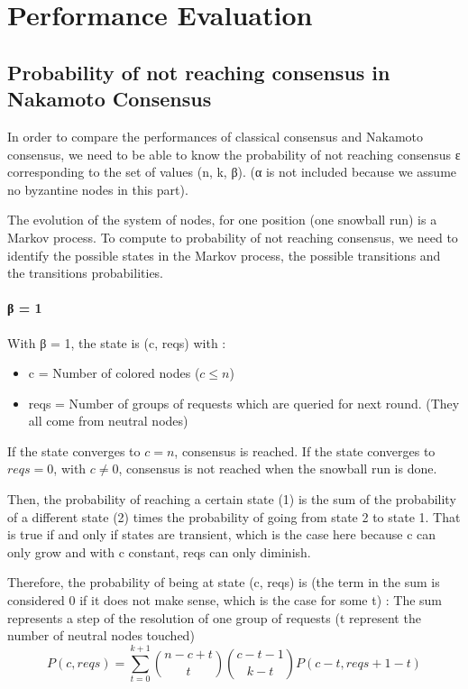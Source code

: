 \documentclass[11pt, twocolumn]{article}
\begin{document}
\section{Performance Evaluation}
\subsection{Probability of not reaching consensus in Nakamoto Consensus}

In order to compare the performances of classical consensus and Nakamoto consensus, we need to be able to know the probability of not reaching consensus ε corresponding to the set 
of values (n, k, β). (α is not included because we assume no byzantine nodes in this part).

The evolution of the system of nodes, for one position (one snowball run) is a Markov process. To compute to probability of not reaching consensus, we need to identify the possible states in the 
Markov process, the possible transitions and the transitions probabilities.

\paragraph{β = 1}
With β = 1, the state is (c, reqs) with :
\begin{itemize}
    \item c = Number of colored nodes ($c \leq n$)
    \item reqs = Number of groups of requests which are queried for next round. (They all come from neutral nodes)
\end{itemize}
If the state converges to $c = n$, consensus is reached.
If the state converges to $reqs = 0$, with $c \neq 0$, consensus is not reached when the snowball run is done.

Then, the probability of reaching a certain state (1) is the sum of the probability of a different state (2) times the probability of going from state 2 to state 1.
That is true if and only if states are transient, which is the case here because c can only grow and with c constant, reqs can only diminish.

Therefore, the probability of being at state (c, reqs) is (the term in the sum is considered 0 if it does not make sense, which is the case for some t) :
The sum represents a step of the resolution of one group of requests (t represent the number of neutral nodes touched)
\begin{equation*}
    P(c, reqs) = \sum_{t=0}^{k+1} {n-c+t \choose t}{c-t-1 \choose k-t}P(c-t, reqs+1-t)
\end{equation*}
\end{document}

